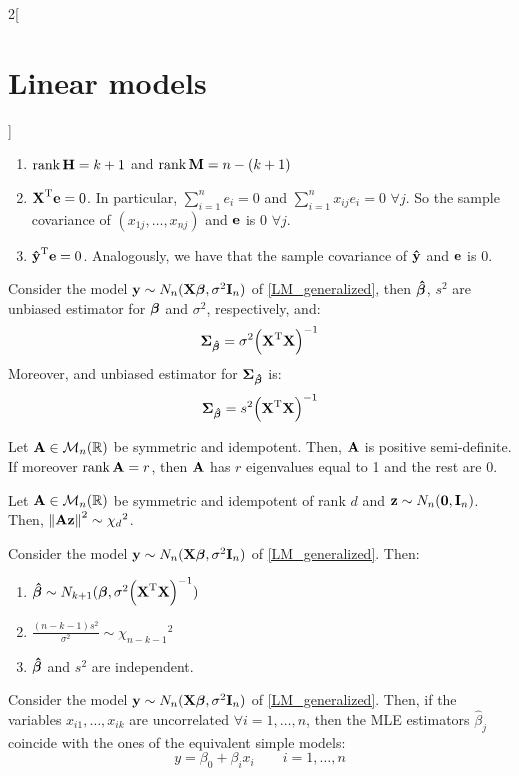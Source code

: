 \documentclass[../../../main_math.tex]{subfiles}
\begin{document}
\begin{multicols}{2}[\section{Linear models}]
\begin{proposition}
\begin{enumerate}
      \item $\rank \boldsymbol{\mathrm{H}}=k+1$ and $\rank \boldsymbol{\mathrm{M}}=n-(k+1)$
      \item ${\boldsymbol{\mathrm{X}}}^{\mathrm{T}}\boldsymbol{\mathrm{e}}=0$. In particular, $\sum_{i=1}^n e_i=0$ and $\sum_{i=1}^n x_{ij}e_i=0$ $\forall j$. So the sample covariance of $(x_{1j},\ldots,x_{nj})$ and $\boldsymbol{\mathrm{e}}$ is 0 $\forall j$.
      \item ${\boldsymbol{\mathrm{\hat{y}}}}^{\mathrm{T}}\boldsymbol{\mathrm{e}}=0$. Analogously, we have that the sample covariance of $\boldsymbol{\mathrm{\hat{y}}}$ and $\boldsymbol{\mathrm{e}}$ is 0.
    \end{enumerate}
  \end{proposition}
  \begin{proposition}
    Consider the model $\boldsymbol{\mathrm{y}}\sim N_n(\boldsymbol{\mathrm{X\beta}},\sigma^2\boldsymbol{\mathrm{I}}_n)$ of \cref{LM_generalized}, then $\boldsymbol{\mathrm{\hat\beta}}$, $s^2$ are unbiased estimator for $\boldsymbol{\mathrm{\beta}}$ and $\sigma^2$, respectively, and: $$\boldsymbol{\mathrm{\Sigma}}_{\boldsymbol{\mathrm{\hat\beta}}}=\sigma^2{\left({\boldsymbol{\mathrm{X}}}^{\mathrm{T}}\boldsymbol{\mathrm{X}}\right)}^{-1}$$
    Moreover, and unbiased estimator for $\boldsymbol{\mathrm{\Sigma}}_{\boldsymbol{\mathrm{\hat\beta}}}$ is: $$\boldsymbol{\mathrm{\Sigma}}_{\boldsymbol{\mathrm{\hat\beta}}}=s^2{\left({\boldsymbol{\mathrm{X}}}^{\mathrm{T}}\boldsymbol{\mathrm{X}}\right)}^{-1}$$
  \end{proposition}
  \begin{proposition}
    Let $\boldsymbol{\mathrm{A}}\in\mathcal{M}_n(\mathbb{R})$ be symmetric and idempotent. Then, $\boldsymbol{\mathrm{A}}$ is positive semi-definite. If moreover $\rank\boldsymbol{\mathrm{A}} =r$, then $\boldsymbol{\mathrm{A}}$ has $r$ eigenvalues equal to 1 and the rest are 0.
  \end{proposition}
  \begin{lemma}
    Let $\boldsymbol{\mathrm{A}}\in\mathcal{M}_n(\mathbb{R})$ be symmetric and idempotent of rank $d$ and $\boldsymbol{\mathrm{z}}\sim N_n(\boldsymbol{\mathrm{0}},\boldsymbol{\mathrm{I}}_n)$. Then, $\left\|\boldsymbol{\mathrm{Az}}\right\|^2\sim{\chi_d}^2$.
  \end{lemma}
  \begin{proposition}
    Consider the model $\boldsymbol{\mathrm{y}}\sim N_n(\boldsymbol{\mathrm{X\beta}},\sigma^2\boldsymbol{\mathrm{I}}_n)$ of \cref{LM_generalized}. Then:
    \begin{enumerate}
      \item $\boldsymbol{\mathrm{\hat\beta}}\sim N_{k+1}(\boldsymbol{\mathrm{\beta}},\sigma^2{\left({\boldsymbol{\mathrm{X}}}^{\mathrm{T}}\boldsymbol{\mathrm{X}}\right)}^{-1})$
      \item $\frac{(n-k-1)s^2}{\sigma^2}\sim{\chi_{n-k-1}}^2$
      \item $\boldsymbol{\mathrm{\hat\beta}}$ and $s^2$ are independent.
    \end{enumerate}
  \end{proposition}
  \begin{proposition}
    Consider the model $\boldsymbol{\mathrm{y}}\sim N_n(\boldsymbol{\mathrm{X\beta}},\sigma^2\boldsymbol{\mathrm{I}}_n)$ of \cref{LM_generalized}. Then, if the variables $x_{i1},\ldots,x_{ik}$ are uncorrelated $\forall i=1,\ldots,n$, then the MLE estimators $\hat\beta_j$ coincide with the ones of the equivalent simple models: $$y=\beta_0+\beta_i x_i\qquad i=1,\ldots,n$$

\end{proposition}
\end{multicols}
\end{document}
